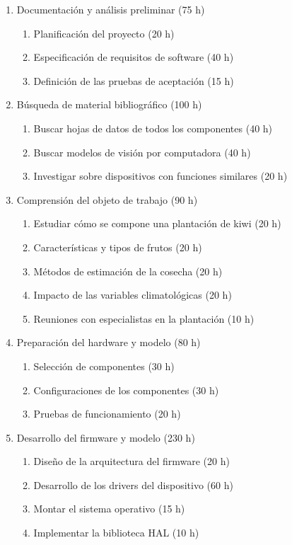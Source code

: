 \documentclass[
11pt, %
]{charter}
\begin{document}
\begin{enumerate}
\item Documentación y análisis preliminar (75 h)
	\begin{enumerate}
	\item Planificación del proyecto (20 h)
	\item Especificación de requisitos de software (40 h)
	\item Definición de las pruebas de aceptación (15 h)
	\end{enumerate}
\item Búsqueda de material bibliográfico (100 h)
	\begin{enumerate}
	\item Buscar hojas de datos de todos los componentes (40 h)
	\item Buscar modelos de visión por computadora (40 h)
	\item Investigar sobre dispositivos con funciones similares (20 h)
	\end{enumerate}
\item Comprensión del objeto de trabajo (90 h)
	\begin{enumerate}
	\item Estudiar cómo se compone una plantación de kiwi (20 h)
	\item Características y tipos de frutos (20 h)
	\item Métodos de estimación de la cosecha (20 h)
	\item Impacto de las variables climatológicas (20 h)
	\item Reuniones con especialistas en la plantación (10 h)
	\end{enumerate}
 \item Preparación del hardware y modelo (80 h)
	\begin{enumerate}
	\item Selección de componentes (30 h)
	\item Configuraciones de los componentes (30 h)
	\item Pruebas de funcionamiento (20 h)
	\end{enumerate}
 \item Desarrollo del firmware y modelo (230 h)
	\begin{enumerate}
	\item Diseño de la arquitectura del firmware (20 h)
	\item Desarrollo de los drivers del dispositivo (60 h)
	\item Montar el sistema operativo (15 h)
	\item Implementar la biblioteca HAL (10 h)

\end{enumerate}
\end{enumerate}
\end{document}
